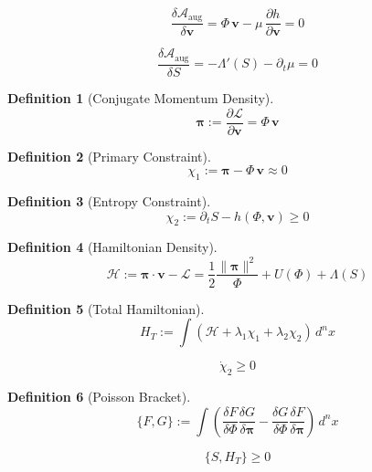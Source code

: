 \documentclass[11pt,oneside]{book}
\newtheorem{definition}{Definition}[chapter]
\begin{document}
\begin{variation}
\[
\frac{\delta \mathcal{A}_{\mathrm{aug}}}{\delta \mathbf{v}}
=
\Phi\,\mathbf{v}
- \mu\,\frac{\partial h}{\partial \mathbf{v}}
= 0
\]
\end{variation}

\begin{variation}
\[
\frac{\delta \mathcal{A}_{\mathrm{aug}}}{\delta S}
=
-\Lambda'(S)
- \partial_t \mu
= 0
\]
\end{variation}

\begin{definition}[Conjugate Momentum Density]
\[
\bm{\pi}
:= \frac{\partial \mathcal{L}}{\partial \mathbf{v}}
= \Phi\,\mathbf{v}
\]
\end{definition}

\begin{definition}[Primary Constraint]
\[
\chi_1
:= \bm{\pi} - \Phi\,\mathbf{v}
\approx 0
\]
\end{definition}

\begin{definition}[Entropy Constraint]
\[
\chi_2
:= \partial_t S - h(\Phi,\mathbf{v})
\ge 0
\]
\end{definition}

\begin{definition}[Hamiltonian Density]
\[
\mathcal{H}
:= \bm{\pi}\cdot\mathbf{v}
- \mathcal{L}
=
\frac{1}{2}\frac{\|\bm{\pi}\|^2}{\Phi}
+ U(\Phi)
+ \Lambda(S)
\]
\end{definition}

\begin{definition}[Total Hamiltonian]
\[
H_T
:= \int
\left(
\mathcal{H}
+ \lambda_1 \chi_1
+ \lambda_2 \chi_2
\right)
\, d^n x
\]
\end{definition}

\begin{constraint}[Consistency]
\[
\dot{\chi}_2 \ge 0
\]
\end{constraint}

\begin{definition}[Poisson Bracket]
\[
\{F,G\}
:= \int
\left(
\frac{\delta F}{\delta \Phi}\frac{\delta G}{\delta \bm{\pi}}
-
\frac{\delta G}{\delta \Phi}\frac{\delta F}{\delta \bm{\pi}}
\right)
\, d^n x
\]
\end{definition}

\begin{axiom}
\[
\{S,H_T\} \ge 0
\]
\end{axiom}
\end{document}
